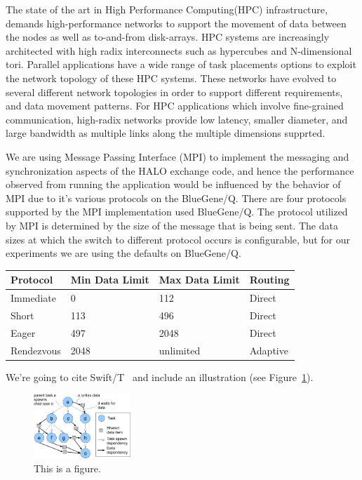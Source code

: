 \documentclass[conference,10pt]{IEEEtran}
\begin{document}
The state of the art in High Performance Computing(HPC) infrastructure, demands high-performance networks
to support the movement of data between the nodes as well as to-and-from disk-arrays. HPC systems are
increasingly architected with high radix interconnects such as hypercubes and N-dimensional tori.
Parallel applications have a wide range of task placements options to exploit the network topology of
these HPC systems. These networks have evolved to several different network topologies in order to support
different requirements, and data movement patterns. For HPC applications which involve fine-grained communication,
high-radix networks provide low latency, smaller diameter, and large bandwidth as multiple links along the multiple
dimensions supprted.


We are using Message Passing Interface (MPI) to implement the messaging and synchronization aspects of the HALO exchange code,
and hence the performance observed from running the application would be influenced by the behavior of MPI due to it's
various protocols on the BlueGene/Q. There are four protocols supported by the MPI implementation used BlueGene/Q.
The protocol utilized by MPI is determined by the size of the message that is being sent. The data sizes at which the switch to
different protocol occurs is configurable, but for our experiments we are using the defaults on BlueGene/Q. 

\begin{center}
    \begin{tabular}{ | l | l | l | p{2cm} |}
    \hline
    Protocol   & Min Data Limit & Max Data Limit & Routing \\ \hline
    Immediate  &              0 &            112 & Direct\\ \hline
    Short      &            113 &            496 & Direct\\ \hline
    Eager      &            497 &           2048 & Direct\\ \hline
    Rendezvous &           2048 &      unlimited & Adaptive\\ \hline
    \hline
    \end{tabular}
\end{center}

We're going to cite Swift/T~\cite{SwiftT_2013} and include an illustration
(see Figure~\ref{fig:task-data}).

\label{sect:ddt-model}
\begin{figure}
  \center
  \includegraphics[width=0.325\textwidth]{fig/task-data}
  \caption{This is a figure.
    \label{fig:task-data}}
\end{figure}
\end{document}
